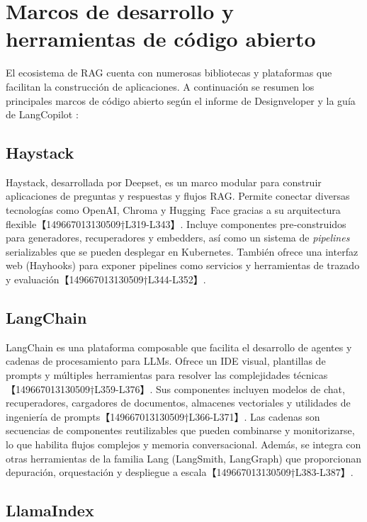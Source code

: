 \section{Marcos de desarrollo y herramientas de código abierto}

El ecosistema de RAG cuenta con numerosas bibliotecas y plataformas que facilitan la construcción de aplicaciones.  A continuación se resumen los principales marcos de código abierto según el informe de Designveloper \cite{designveloper2025frameworks} y la guía de LangCopilot \cite{langcopilot2025guide}:

\subsection{Haystack}

Haystack, desarrollada por Deepset, es un marco modular para construir aplicaciones de preguntas y respuestas y flujos RAG.  Permite conectar diversas tecnologías como OpenAI, Chroma y Hugging Face gracias a su arquitectura flexible【149667013130509†L319-L343】.  Incluye componentes pre‑construidos para generadores, recuperadores y embedders, así como un sistema de \textit{pipelines} serializables que se pueden desplegar en Kubernetes.  También ofrece una interfaz web (Hayhooks) para exponer pipelines como servicios y herramientas de trazado y evaluación【149667013130509†L344-L352】.

\subsection{LangChain}

LangChain es una plataforma composable que facilita el desarrollo de agentes y cadenas de procesamiento para LLMs.  Ofrece un IDE visual, plantillas de prompts y múltiples herramientas para resolver las complejidades técnicas【149667013130509†L359-L376】.  Sus componentes incluyen modelos de chat, recuperadores, cargadores de documentos, almacenes vectoriales y utilidades de ingeniería de prompts【149667013130509†L366-L371】.  Las cadenas son secuencias de componentes reutilizables que pueden combinarse y monitorizarse, lo que habilita flujos complejos y memoria conversacional.  Además, se integra con otras herramientas de la familia Lang (LangSmith, LangGraph) que proporcionan depuración, orquestación y despliegue a escala【149667013130509†L383-L387】.

\subsection{LlamaIndex}

